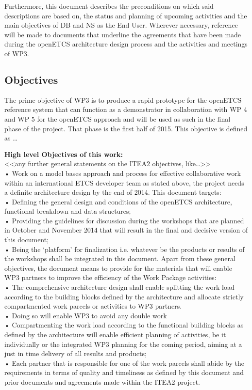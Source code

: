 \documentclass{template/openetcs_report}
\begin{document}
Furthermore, this document describes the preconditions on which said descriptions are based on, the status and planning of upcoming activities and the main objectives of DB and NS as the End User. Wherever necessary, reference will be made to documents that underline the agreements that have been made during the openETCS architecture design process and the activities and meetings of WP3. \\


\subsection{Objectives}

The prime objective of WP3 is to produce a rapid prototype for the openETCS reference system that can function as a demonstrator in collaboration with WP 4 and WP 5  for the openETCS approach and will be used as such in the final phase of the project. That phase is the first half of 2015.  This objective is defined as … 

\textbf{High level Objectives of this work:}\\
<<any further general statements on the ITEA2  objectives, like…>>\\
• Work on a model bases approach and process for effective collaborative work within an international ETCS developer team
as stated above, the project needs a definite architecture design by the end of 2014.  This document targets:\\
•	Defining the general design and conditions of the openETCS architecture, functional breakdown and data structures;\\
•	Providing the guidelines for discussion during the workshops that are planned in October and November 2014 that will result in the final and decisive version of this document;\\
•	Being the ‘platform’ for finalization i.e. whatever be the products or results of the workshops shall be integrated in this document. 
Apart from these general objectives, the document means to provide for the materials that will enable WP3 partners to improve the efficiency of the Work Package activities:\\
• The comprehensive architecture design shall enable splitting the work load according to the building blocks defined by the architecture and allocate strictly compartmented work parcels or activities to WP3 partners. \\
• Doing so will enable WP3 to avoid any double work\\
• Compartmenting the work load according to the functional building blocks as defined by the architecture will enable efficient planning of activities, be it individually or the integrated WP3 planning for the coming period, aiming at a just in time delivery of all results and products;\\
• Each partner that is responsible for one of the work parcels shall abide by the requirements in terms of quality and timeliness as defined by this document and prior documents and agreements made within the ITEA2 project.\\
\end{document}
